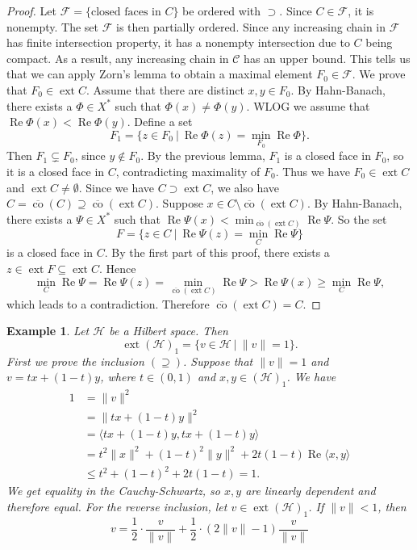 \documentclass[10pt, a4paper]{article}
\newtheorem{example}[thm]{Example}
\newenvironment{noticeC}{%
  \tcolorbox[%
  notitle,
  empty,
  enhanced,  %
  breakable,
  coltext=black, 
  fontupper=\rmfamily,
  noparskip,
  sharp corners,
  boxrule=-1pt,  %
  frame hidden,
  left=7pt,  %
  right=7pt,
  top=5pt,
  bottom=5pt,
  before skip=2.5ex plus 2pt,
  after skip=2.5ex plus 2pt,
  overlay unbroken and last={%
  },
  ]}
{\endtcolorbox}
\newenvironment{myproof}%
  {\begin{noticeC}\begin{proof}}%
  {\end{proof}\end{noticeC}}
\DeclareMathOperator{\ext}{ext}
\DeclareMathOperator{\co}{co}
\DeclareMathOperator{\real}{Re}
\begin{document}
\begin{myproof}
  Let $\mathcal{F} = \{\textrm{closed faces in $C$}\}$ be ordered with $\supset$.
  Since $C \in \mathcal{F}$, it is nonempty. The set $\mathcal{F}$ is then partially ordered. Since any 
  increasing chain in $\mathcal{F}$ has finite intersection property, it has a nonempty intersection due to $C$ being compact.
  As a result, any increasing chain in $\mathcal{C}$ has an upper bound.
  This tells us that we can apply Zorn's lemma to obtain a maximal element $F_0 \in \mathcal{F}$.
  We prove that $F_0 \in \ext C$. Assume that there are distinct $x, y \in F_0$.
  By Hahn-Banach, there exists a $\Phi \in X^*$ such that $\Phi(x) \neq \Phi(y)$.
  WLOG we assume that $\real \Phi(x) < \real \Phi(y)$. Define a set 
  $$F_1 = \{z \in F_0\ |\ \real \Phi(z) = \min_{F_0} \real \Phi\}.$$
  Then $F_1 \subsetneq F_0$, since $y \notin F_0$. By the previous lemma,
  $F_1$ is a closed face in $F_0$, so it is a closed face in $C$, contradicting maximality of $F_0$.
  Thus we have $F_0 \in \ext C$ and $\ext C \neq \emptyset$.
  Since we have $C \supset \ext C$, we also have $C = \overline{\co} (C) \supseteq \overline{\co} (\ext C)$.
  Suppose $x \in C \setminus \overline{\co} (\ext C)$. By Hahn-Banach, there exists a $\Psi \in X^*$
  such that $\real \Psi(x) < \min _{\overline{\co} (\ext C)} \real \Psi$.
  So the set 
  $$F = \{z \in C\ |\ \real \Psi (z) = \min_C \real \Psi\}$$
  is a closed face in $C$. By the first part of this proof,
  there exists a $z \in \ext F \subseteq \ext C$. Hence 
  $$\min_C \real \Psi = \real \Psi (z) = \min_{\overline{\co} (\ext C)} \real \Psi > \real \Psi(x) \geq \min_C \real \Psi,$$
  which leads to a contradiction. Therefore $\overline{\co} (\ext C) = C$.
\end{myproof}

\begin{example}
  Let $\mathcal{H}$ be a Hilbert space. Then 
  $$\ext (\mathcal{H})_1 = \{v \in \mathcal{H}\ |\ \|v\| = 1\}.$$
  First we prove the inclusion $(\supseteq)$. Suppose that 
  $\| v\| = 1$ and $v = tx + (1 - t)y$, where $t \in (0, 1)$ and $x, y \in (\mathcal{H})_1$.
  We have 
  \begin{align*}
    1 &= \| v\|^2\\
    &= \| tx + (1 - t)y\|^2\\
    &= \langle tx + (1 - t)y, tx + (1 - t)y \rangle\\
    &= t^2 \|x\|^2 + (1 - t)^2 \|y\|^2 + 2t(1 - t)\real \langle x, y\rangle\\
    &\leq t^2 + (1 - t)^2 + 2t(1 - t) = 1.
  \end{align*}
  We get equality in the Cauchy-Schwartz, so $x, y$ are linearly dependent and therefore equal.
  For the reverse inclusion, let $v \in \ext (\mathcal{H})_1$. If $\| v\| < 1$, then 
  $$v = \frac{1}{2} \cdot \frac{v}{\|v\|} + \frac{1}{2} \cdot \left(2{\|v\|} - 1 \right) \frac{v}{\|v\|}$$
\end{example}
\end{document}
